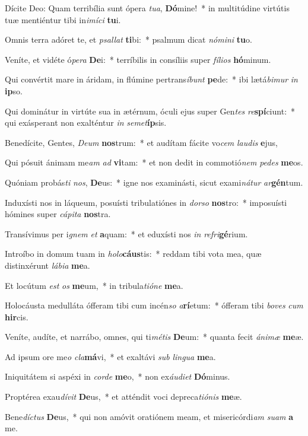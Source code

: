 \item Dícite Deo: Quam terribília sunt ópera \textit{tu}\textit{a}, \textbf{Dó}mine!~* in multitúdine virtútis tuæ mentiéntur tibi in\textit{i}\textit{mí}\textit{ci} \textbf{tu}i.
\item Omnis terra adóret te, et \textit{psal}\textit{lat} \textbf{ti}bi:~* psalmum dicat \textit{nó}\textit{mi}\textit{ni} \textbf{tu}o.
\item Veníte, et vidéte ó\textit{pe}\textit{ra} \textbf{De}i:~* terríbilis in consíliis super \textit{fí}\textit{li}\textit{os} \textbf{hó}minum.
\item Qui convértit mare in áridam, in flúmine pertrans\textit{í}\textit{bunt} \textbf{pe}de:~* ibi lætá\textit{bi}\textit{mur} \textit{in} \textbf{ip}so.
\item Qui dominátur in virtúte sua in ætérnum, óculi ejus super Gen\textit{tes} \textit{re}\textbf{spí}ciunt:~* qui exásperant non exalténtur \textit{in} \textit{se}\textit{met}\textbf{íp}sis.
\item Benedícite, Gentes, \textit{De}\textit{um} \textbf{nos}trum:~* et audítam fácite vo\textit{cem} \textit{lau}\textit{dis} \textbf{e}jus,
\item Qui pósuit ánimam me\textit{am} \textit{ad} \textbf{vi}tam:~* et non dedit in commotió\textit{nem} \textit{pe}\textit{des} \textbf{me}os.
\item Quóniam probás\textit{ti} \textit{nos}, \textbf{De}us:~* igne nos examinásti, sicut exami\textit{ná}\textit{tur} \textit{ar}\textbf{gén}tum.
\item Induxísti nos in láqueum, posuísti tribulatiónes in \textit{dor}\textit{so} \textbf{nos}tro:~* imposuísti hómines super \textit{cá}\textit{pi}\textit{ta} \textbf{nos}tra.
\item Transívimus per i\textit{gnem} \textit{et} \textbf{a}quam:~* et eduxísti nos \textit{in} \textit{re}\textit{fri}\textbf{gé}rium.
\item Introíbo in domum tuam in \textit{ho}\textit{lo}\textbf{cáus}tis:~* reddam tibi vota mea, quæ distinxérunt \textit{lá}\textit{bi}\textit{a} \textbf{me}a.
\item Et locútum \textit{est} \textit{os} \textbf{me}um,~* in tribula\textit{ti}\textit{ó}\textit{ne} \textbf{me}a.
\item Holocáusta medulláta ófferam tibi cum incén\textit{so} \textit{a}\textbf{rí}etum:~* ófferam tibi \textit{bo}\textit{ves} \textit{cum} \textbf{hir}cis.
\item Veníte, audíte, et narrábo, omnes, qui ti\textit{mé}\textit{tis} \textbf{De}um:~* quanta fecit \textit{á}\textit{ni}\textit{mæ} \textbf{me}æ.
\item Ad ipsum ore me\textit{o} \textit{cla}\textbf{má}vi,~* et exaltávi \textit{sub} \textit{lin}\textit{gua} \textbf{me}a.
\item Iniquitátem si aspéxi in \textit{cor}\textit{de} \textbf{me}o,~* non ex\textit{áu}\textit{di}\textit{et} \textbf{Dó}minus.
\item Proptérea exau\textit{dí}\textit{vit} \textbf{De}us,~* et atténdit voci depreca\textit{ti}\textit{ó}\textit{nis} \textbf{me}æ.
\item Bene\textit{díc}\textit{tus} \textbf{De}us,~* qui non amóvit oratiónem meam, et misericórdi\textit{am} \textit{su}\textit{am} \textbf{a} me.
